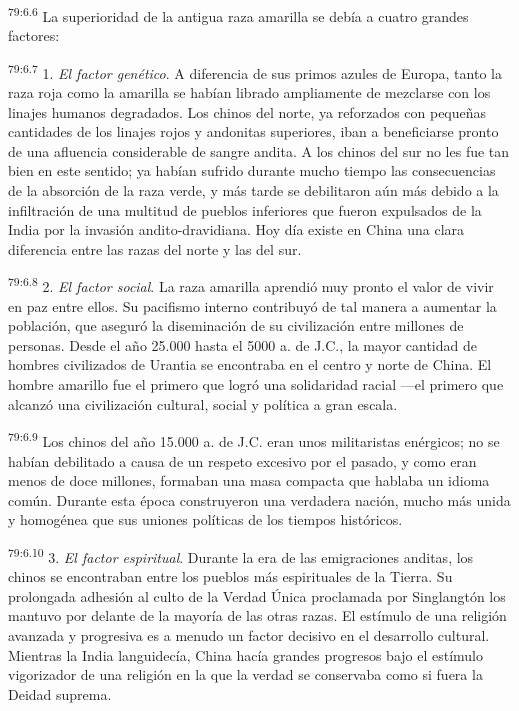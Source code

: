 \par
\textsuperscript{79:6.6} La superioridad de la antigua raza amarilla se debía a cuatro grandes factores:

\par
\textsuperscript{79:6.7} 1. \textit{El factor genético}. A diferencia de sus primos azules de Europa, tanto la raza roja como la amarilla se habían librado ampliamente de mezclarse con los linajes humanos degradados. Los chinos del norte, ya reforzados con pequeñas cantidades de los linajes rojos y andonitas superiores, iban a beneficiarse pronto de una afluencia considerable de sangre andita. A los chinos del sur no les fue tan bien en este sentido; ya habían sufrido durante mucho tiempo las consecuencias de la absorción de la raza verde, y más tarde se debilitaron aún más debido a la infiltración de una multitud de pueblos inferiores que fueron expulsados de la India por la invasión andito-dravidiana. Hoy día existe en China una clara diferencia entre las razas del norte y las del sur.

\par
\textsuperscript{79:6.8} 2. \textit{El factor social}. La raza amarilla aprendió muy pronto el valor de vivir en paz entre ellos. Su pacifismo interno contribuyó de tal manera a aumentar la población, que aseguró la diseminación de su civilización entre millones de personas. Desde el año 25.000 hasta el 5000 a. de J.C., la mayor cantidad de hombres civilizados de Urantia se encontraba en el centro y norte de China. El hombre amarillo fue el primero que logró una solidaridad racial ---el primero que alcanzó una civilización cultural, social y política a gran escala.

\par
\textsuperscript{79:6.9} Los chinos del año 15.000 a. de J.C. eran unos militaristas enérgicos; no se habían debilitado a causa de un respeto excesivo por el pasado, y como eran menos de doce millones, formaban una masa compacta que hablaba un idioma común. Durante esta época construyeron una verdadera nación, mucho más unida y homogénea que sus uniones políticas de los tiempos históricos.

\par
\textsuperscript{79:6.10} 3. \textit{El factor espiritual}. Durante la era de las emigraciones anditas, los chinos se encontraban entre los pueblos más espirituales de la Tierra. Su prolongada adhesión al culto de la Verdad Única proclamada por Singlangtón los mantuvo por delante de la mayoría de las otras razas. El estímulo de una religión avanzada y progresiva es a menudo un factor decisivo en el desarrollo cultural. Mientras la India languidecía, China hacía grandes progresos bajo el estímulo vigorizador de una religión en la que la verdad se conservaba como si fuera la Deidad suprema.

